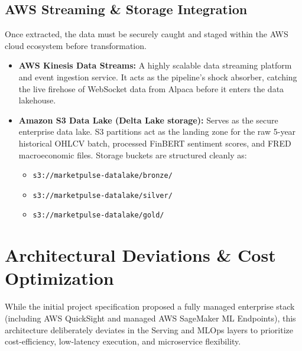 \documentclass[11pt,a4paper]{article}
\begin{document}
\subsection{AWS Streaming \& Storage Integration}
Once extracted, the data must be securely caught and staged within the AWS cloud ecosystem before transformation.
\begin{itemize}[leftmargin=*]
    \item \textbf{AWS Kinesis Data Streams:} A highly scalable data streaming platform and event ingestion service. It acts as the pipeline's shock absorber, catching the live firehose of WebSocket data from Alpaca before it enters the data lakehouse.
    \item \textbf{Amazon S3 Data Lake (Delta Lake storage):} Serves as the secure enterprise data lake. S3 partitions act as the landing zone for the raw 5-year historical OHLCV batch, processed FinBERT sentiment scores, and FRED macroeconomic files. Storage buckets are structured cleanly as:
    \begin{itemize}
        \item \texttt{s3://marketpulse-datalake/bronze/}
        \item \texttt{s3://marketpulse-datalake/silver/}
        \item \texttt{s3://marketpulse-datalake/gold/}
    \end{itemize}
\end{itemize}

\section{Architectural Deviations \& Cost Optimization}
While the initial project specification proposed a fully managed enterprise stack (including AWS QuickSight and managed AWS SageMaker ML Endpoints), this architecture deliberately deviates in the Serving and MLOps layers to prioritize cost-efficiency, low-latency execution, and microservice flexibility.
\end{document}
